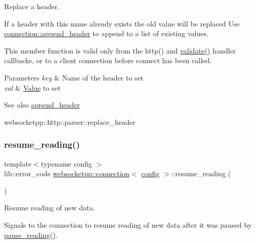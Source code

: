 Replace a header. 

If a header with this name already exists the old value will be replaced Use {\ttfamily \mbox{\hyperlink{classwebsocketpp_1_1connection_af8cb78acc61b8a3d59f6162cdba6318b}{connection\+::append\+\_\+header}}} to append to a list of existing values.

This member function is valid only from the http() and \mbox{\hyperlink{authority_8hpp_a98696231ed7d6f1c166797053cebc5eb}{validate()}} handler callbacks, or to a client connection before connect has been called.


\begin{DoxyParams}{Parameters}
{\em key} & Name of the header to set \\
\hline
{\em val} & \mbox{\hyperlink{struct_value}{Value}} to set \\
\hline
\end{DoxyParams}
\begin{DoxySeeAlso}{See also}
\mbox{\hyperlink{classwebsocketpp_1_1connection_af8cb78acc61b8a3d59f6162cdba6318b}{append\+\_\+header}} 

websocketpp\+::http\+::parser\+::replace\+\_\+header 
\end{DoxySeeAlso}
\mbox{\label{classwebsocketpp_1_1connection_a355b5e155ba53071b06fa8a6dfab9be2}} 
\subsubsection{\texorpdfstring{resume\+\_\+reading()}{resume\_reading()}}
{\footnotesize\ttfamily template$<$typename config $>$ \\
lib\+::error\+\_\+code \mbox{\hyperlink{classwebsocketpp_1_1connection}{websocketpp\+::connection}}$<$ \mbox{\hyperlink{classconfig}{config}} $>$\+::resume\+\_\+reading (\begin{DoxyParamCaption}{ }\end{DoxyParamCaption})}



Resume reading of new data. 

Signals to the connection to resume reading of new data after it was paused by {\ttfamily \mbox{\hyperlink{classwebsocketpp_1_1connection_ad6a4a25a18ec61d2a36a149a3d92ab72}{pause\+\_\+reading()}}}.

